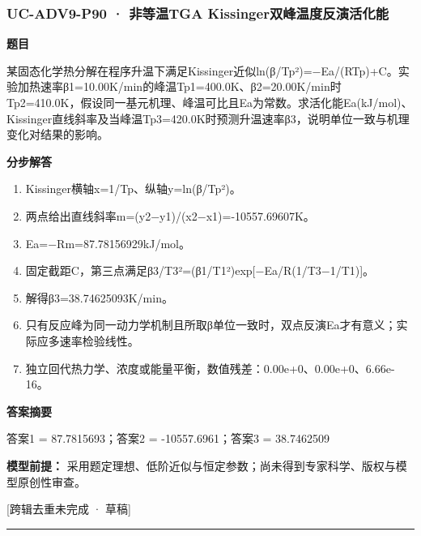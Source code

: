 \documentclass[UTF8,11pt,a4paper]{ctexart}
\begin{document}
\subsubsection*{UC-ADV9-P90 · 非等温TGA Kissinger双峰温度反演活化能}
\noindent\textbf{题目}\par
某固态化学热分解在程序升温下满足Kissinger近似ln(β/Tp²)=−Ea/(RTp)+C。实验加热速率β1=10.00K/min的峰温Tp1=400.0K、β2=20.00K/min时Tp2=410.0K，假设同一基元机理、峰温可比且Ea为常数。求活化能Ea(kJ/mol)、Kissinger直线斜率及当峰温Tp3=420.0K时预测升温速率β3，说明单位一致与机理变化对结果的影响。\par
\medskip\noindent\textbf{分步解答}
\begin{enumerate}
\item Kissinger横轴x=1/Tp、纵轴y=ln(β/Tp²)。
\item 两点给出直线斜率m=(y2−y1)/(x2−x1)=-10557.69607K。
\item Ea=−Rm=87.78156929kJ/mol。
\item 固定截距C，第三点满足β3/T3²=(β1/T1²)exp[−Ea/R(1/T3−1/T1)]。
\item 解得β3=38.74625093K/min。
\item 只有反应峰为同一动力学机制且所取β单位一致时，双点反演Ea才有意义；实际应多速率检验线性。
\item 独立回代热力学、浓度或能量平衡，数值残差：0.00e+0、0.00e+0、6.66e-16。
\end{enumerate}
\noindent\textbf{答案摘要}\par
答案1 = 87.7815693；答案2 = -10557.6961；答案3 = 38.7462509\par
\noindent\textbf{模型前提：}
采用题定理想、低阶近似与恒定参数；尚未得到专家科学、版权与模型原创性审查。\par
\noindent\textcolor{red!65!black}{[跨辑去重未完成 · 草稿]} \par
\medskip\hrule\medskip
{}
\end{document}
